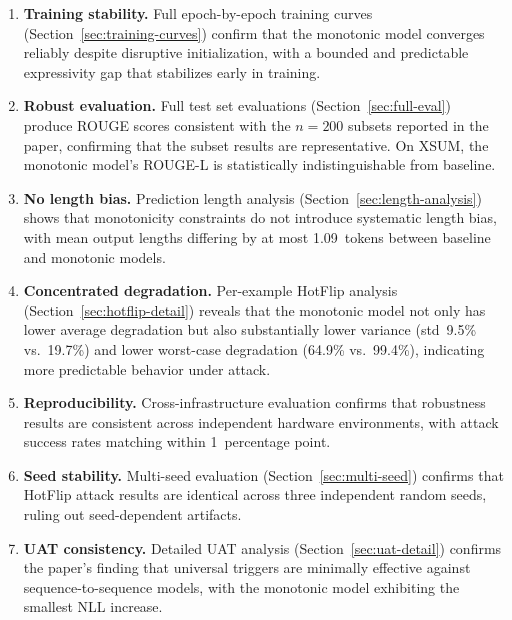 \documentclass{article}
\begin{document}
\begin{enumerate}
    \item \textbf{Training stability.} Full epoch-by-epoch training curves (Section~\ref{sec:training-curves}) confirm that the monotonic model converges reliably despite disruptive initialization, with a bounded and predictable expressivity gap that stabilizes early in training.

    \item \textbf{Robust evaluation.} Full test set evaluations (Section~\ref{sec:full-eval}) produce ROUGE scores consistent with the $n=200$ subsets reported in the paper, confirming that the subset results are representative. On XSUM, the monotonic model's ROUGE-L is statistically indistinguishable from baseline.

    \item \textbf{No length bias.} Prediction length analysis (Section~\ref{sec:length-analysis}) shows that monotonicity constraints do not introduce systematic length bias, with mean output lengths differing by at most 1.09~tokens between baseline and monotonic models.

    \item \textbf{Concentrated degradation.} Per-example HotFlip analysis (Section~\ref{sec:hotflip-detail}) reveals that the monotonic model not only has lower average degradation but also substantially lower variance (std~9.5\% vs.\ 19.7\%) and lower worst-case degradation (64.9\% vs.\ 99.4\%), indicating more predictable behavior under attack.

    \item \textbf{Reproducibility.} Cross-infrastructure evaluation confirms that robustness results are consistent across independent hardware environments, with attack success rates matching within 1~percentage point.

    \item \textbf{Seed stability.} Multi-seed evaluation (Section~\ref{sec:multi-seed}) confirms that HotFlip attack results are identical across three independent random seeds, ruling out seed-dependent artifacts.

    \item \textbf{UAT consistency.} Detailed UAT analysis (Section~\ref{sec:uat-detail}) confirms the paper's finding that universal triggers are minimally effective against sequence-to-sequence models, with the monotonic model exhibiting the smallest NLL increase.


\end{enumerate}
\end{document}
